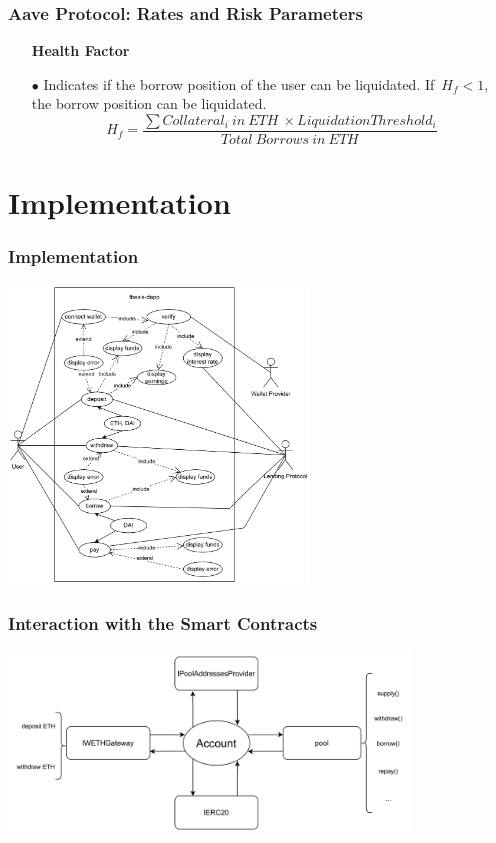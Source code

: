\documentclass{beamer}
\begin{document}
\begin{frame}	
	\frametitle{Aave Protocol: Rates and Risk Parameters}
	\begin{itemize}
		\item[] \textbf{Health Factor}
		\linebreak
		\item[$\bullet$] Indicates if the borrow position of the user can be liquidated.
		If~$H_{f} < 1$, the borrow position can be liquidated.
		\[ H_{f} = \frac{\sum Collateral_{i}~in~ETH~\times Liquidation Threshold_{i}}{Total~Borrows~in~ETH} \]
		
	\end{itemize}
	
\end{frame}


\section{Implementation}

\begin{frame}
\frametitle{Implementation}
\includegraphics[width=0.6\textwidth, center]{../images/USECASE-full_nofl1}
\end{frame}

\begin{frame}
	\frametitle{Interaction with the Smart Contracts}
	\includegraphics[width=0.8\textwidth, center]{../images/interactionSC}
\end{frame}
\end{document}
